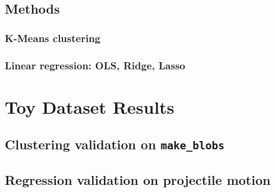 \documentclass[11pt,a4paper]{article}
\begin{document}
\subsection{Methods}\label{sec:methods}

\subsubsection{K-Means clustering}

\subsubsection{Linear regression: OLS, Ridge, Lasso}

\section{Toy Dataset Results}\label{sec:toy}

\subsection{Clustering validation on \texttt{make\_blobs}}

\subsection{Regression validation on projectile motion}
\end{document}
